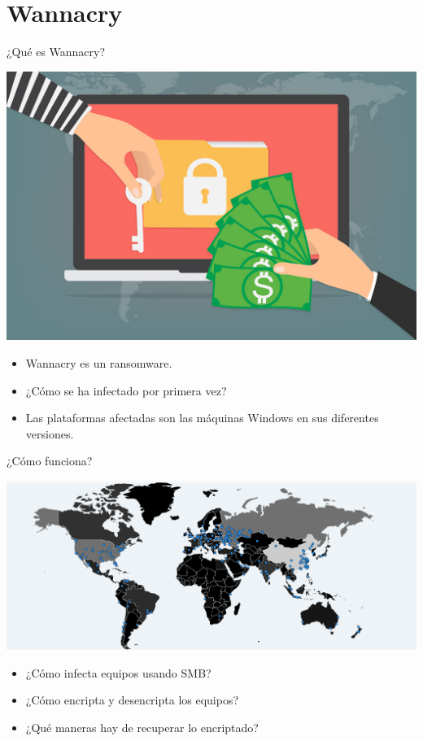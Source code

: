 \documentclass[10pt]{beamer}
\begin{document}
\section{Wannacry}

\begin{frame}{¿Qué es Wannacry?}
	\pause
	\begin{center}
		\includegraphics[scale=0.15]{./Imagenes/wannacry-1.jpg}
	\end{center}
	\pause
	\begin{itemize}
		\item Wannacry es un ransomware.
		\pause
		\item ¿Cómo se ha infectado por primera vez?
		\pause
		\item Las plataformas afectadas son las máquinas Windows en sus diferentes versiones.
	\end{itemize}
\end{frame}

\begin{frame}{¿Cómo funciona?}
	\pause
	\begin{center}
		\includegraphics[scale=0.15]{./Imagenes/wannacry-2.png}
	\end{center}
	\pause
	\begin{itemize}
		\item ¿Cómo infecta equipos usando SMB?
		\pause
		\item ¿Cómo encripta y desencripta los equipos?
		\pause
		\item ¿Qué maneras hay de recuperar lo encriptado?
	\end{itemize}
\end{frame}
\end{document}
